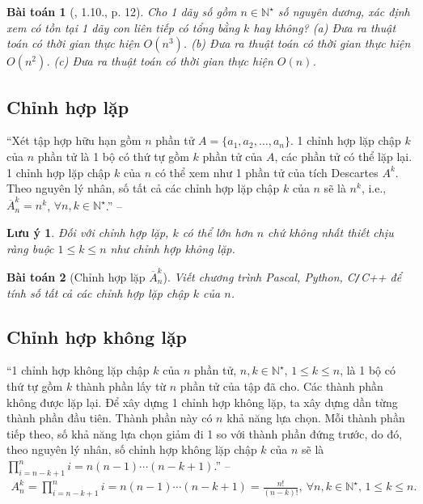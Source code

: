 \documentclass{article}
\newtheorem{baitoan}{Bài toán}
\newtheorem{luuy}{Lưu ý}
\begin{document}
\begin{baitoan}[\cite{TLGK_chuyen_Tin_quyen_1}, 1.10., p. 12]
	Cho 1 dãy số gồm $n\in\mathbb{N}^\star$ số nguyên dương, xác định xem có tồn tại 1 dãy con liên tiếp có tổng bằng $k$ hay không? (a) Đưa ra thuật toán có thời gian thực hiện $O(n^3)$. (b) Đưa ra thuật toán có thời gian thực hiện $O(n^2)$. (c) Đưa ra thuật toán có thời gian thực hiện $O(n)$.
\end{baitoan}

\subsection{Chỉnh hợp lặp}
``Xét tập hợp hữu hạn gồm $n$ phần tử $A = \{a_1,a_2,\ldots,a_n\}$. 1 chỉnh  hợp lặp chập $k$ của $n$ phần tử là 1 bộ có thứ tự gồm $k$ phần tử của $A$, các phần tử có thể lặp lại. 1 chỉnh hợp lặp chập $k$ của $n$ có thể xem như 1 phần tử của tích Descartes $A^k$. Theo nguyên lý nhân, số tất cả các chỉnh hợp lặp chập $k$ của $n$ sẽ là $n^k$, i.e., $\overline{A}_n^k = n^k$, $\forall n,k\in\mathbb{N}^\star$.'' -- \cite[Sect. 4.7, p. 20]{TLGK_chuyen_Tin_quyen_1}

\begin{luuy}
	Đối với chỉnh hợp lặp, $k$ có thể lớn hơn $n$ chứ không nhất thiết chịu ràng buộc $1\le k\le n$ như chỉnh hợp không lặp.
\end{luuy}

\begin{baitoan}[Chỉnh hợp lặp $\overline{A}_n^k$]
	Viết chương trình {\sf Pascal, Python, C\texttt{/}C++} để tính số tất cả các chỉnh hợp lặp chập $k$ của $n$.
\end{baitoan}

\subsection{Chỉnh hợp không lặp}
``1 chỉnh hợp không lặp chập $k$ của $n$ phần tử, $n,k\in\mathbb{N}^\star$, $1\le k\le n$, là 1 bộ có thứ tự gồm $k$ thành phần lấy từ $n$ phần tử của tập đã cho. Các thành phần không được lặp lại. Để xây dựng 1 chỉnh hợp không lặp, ta xây dựng dần từng thành phần đầu tiên. Thành phần này có $n$ khả năng lựa chọn. Mỗi thành phần tiếp theo, số khả năng lựa chọn giảm đi 1 so với thành phần đứng trước, do đó, theo nguyên lý nhân, số chỉnh hợp không lặp chập $k$ của $n$ sẽ là $\prod_{i=n-k+1}^n i = n(n - 1)\cdots(n - k + 1)$.'' -- \cite[Sect. 4.8, pp. 20--21]{TLGK_chuyen_Tin_quyen_1}
\begin{align*}
	A_n^k = \prod_{i=n-k+1}^n i = n(n - 1)\cdots(n - k + 1) = \frac{n!}{(n - k)!},\ \forall n,k\in\mathbb{N}^\star,\,1\le k\le n.
\end{align*}
\end{document}
